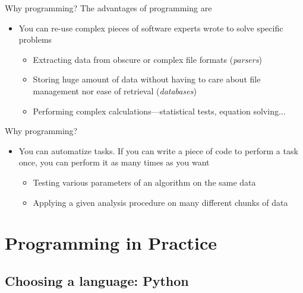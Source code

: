 \documentclass[handout]{beamer}
\begin{document}
\begin{frame}{Why programming?}
	The advantages of programming are
	\begin{itemize}
		\item You can re-use complex pieces of software experts wrote to solve specific problems
		\begin{itemize}
			\pause
			\item Extracting data from obscure or complex file formats (\textit{parsers})
			\pause
			\item Storing huge amount of data without having to care about file management nor ease of retrieval (\textit{databases})
			\pause
			\item Performing complex calculations---statistical tests, equation solving...
		\end{itemize}
	\end{itemize}
\end{frame}

\begin{frame}{Why programming?}
	\begin{itemize}
		\item You can automatize tasks. If you can write a piece of code to perform a task once, you can perform it as many times as you want
		\begin{itemize}
			\pause
			\item Testing various parameters of an algorithm on the same data
			\pause
			\item Applying a given analysis procedure on many different chunks of data
		\end{itemize}
	\end{itemize}
\end{frame}


\section{Programming in Practice}

\subsection{Choosing a language: Python}
\end{document}

